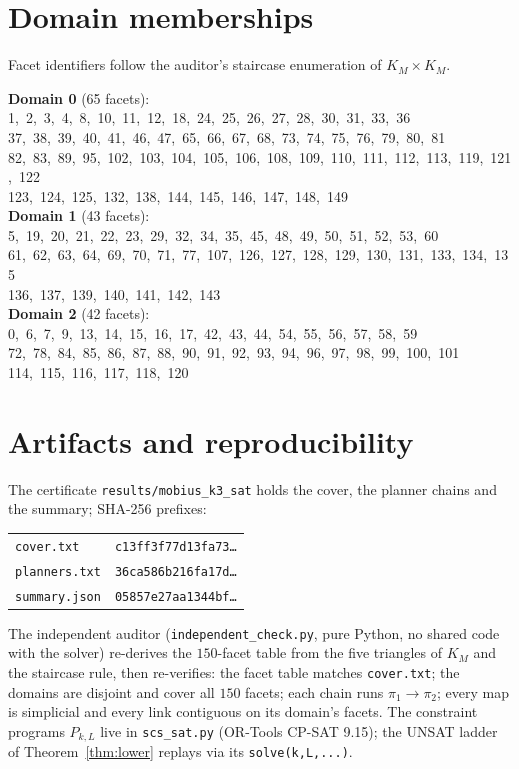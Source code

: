 \documentclass[11pt]{article}
\theoremstyle{remark}
\begin{document}
\section{Domain memberships}\label{app:facets}
Facet identifiers follow the auditor's staircase enumeration of
$K_M\times K_M$.

\begin{center}
\textbf{Domain 0} (65 facets):
\footnotesize 1,\ 2,\ 3,\ 4,\ 8,\ 10,\ 11,\ 12,\ 18,\ 24,\ 25,\ 26,\ 27,\ 28,\ 30,\ 31,\ 33,\ 36 \\
37,\ 38,\ 39,\ 40,\ 41,\ 46,\ 47,\ 65,\ 66,\ 67,\ 68,\ 73,\ 74,\ 75,\ 76,\ 79,\ 80,\ 81 \\
82,\ 83,\ 89,\ 95,\ 102,\ 103,\ 104,\ 105,\ 106,\ 108,\ 109,\ 110,\ 111,\ 112,\ 113,\ 119,\ 121,\ 122 \\
123,\ 124,\ 125,\ 132,\ 138,\ 144,\ 145,\ 146,\ 147,\ 148,\ 149 \\
\medskip
\textbf{Domain 1} (43 facets):
\footnotesize 5,\ 19,\ 20,\ 21,\ 22,\ 23,\ 29,\ 32,\ 34,\ 35,\ 45,\ 48,\ 49,\ 50,\ 51,\ 52,\ 53,\ 60 \\
61,\ 62,\ 63,\ 64,\ 69,\ 70,\ 71,\ 77,\ 107,\ 126,\ 127,\ 128,\ 129,\ 130,\ 131,\ 133,\ 134,\ 135 \\
136,\ 137,\ 139,\ 140,\ 141,\ 142,\ 143 \\
\medskip
\textbf{Domain 2} (42 facets):
\footnotesize 0,\ 6,\ 7,\ 9,\ 13,\ 14,\ 15,\ 16,\ 17,\ 42,\ 43,\ 44,\ 54,\ 55,\ 56,\ 57,\ 58,\ 59 \\
72,\ 78,\ 84,\ 85,\ 86,\ 87,\ 88,\ 90,\ 91,\ 92,\ 93,\ 94,\ 96,\ 97,\ 98,\ 99,\ 100,\ 101 \\
114,\ 115,\ 116,\ 117,\ 118,\ 120
\end{center}

\section{Artifacts and reproducibility}\label{app:repro}
The certificate \texttt{results/mobius\_k3\_sat} holds the cover, the
planner chains and the summary; SHA-256 prefixes:
\begin{center}
\begin{tabular}{ll}
\texttt{cover.txt} & \texttt{c13ff3f77d13fa73\ldots} \\
\texttt{planners.txt} & \texttt{36ca586b216fa17d\ldots} \\
\texttt{summary.json} & \texttt{05857e27aa1344bf\ldots}
\end{tabular}
\end{center}
The independent auditor (\texttt{independent\_check.py}, pure Python, no
shared code with the solver) re-derives the $150$-facet table from the five
triangles of $K_M$ and the staircase rule, then re-verifies: the facet
table matches \texttt{cover.txt}; the domains are disjoint and cover all
$150$ facets; each chain runs $\pi_1\to\pi_2$; every map is simplicial and
every link contiguous on its domain's facets.  The constraint programs
$P_{k,L}$ live in \texttt{scs\_sat.py} (OR-Tools CP-SAT 9.15); the UNSAT
ladder of Theorem~\ref{thm:lower} replays via its \texttt{solve(k,L,...)}.
\end{document}
